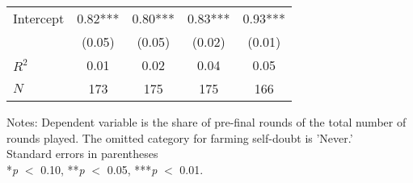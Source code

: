 \begin{table}[htbp]
\begin{threeparttable}
\begin{tabular}{l cccc}
Intercept           &        0.82***&        0.80***&        0.83***&        0.93***\\
                    &      (0.05)   &      (0.05)   &      (0.02)   &      (0.01)   \\
\hline
$R^2$               &        0.01   &        0.02   &        0.04   &        0.05   \\
$N$                 &         173   &         175   &         175   &         166   \\
\hline
\hline
\end{tabular}
\begin{tablenotes}
\footnotesize
\item{Notes: Dependent variable is the share of pre-final rounds of the total number of rounds played. The omitted category for farming self-doubt is 'Never.' \\ Standard errors in parentheses \\ *\textit{p} $<$ 0.10, **\textit{p} $<$ 0.05, ***\textit{p} $<$ 0.01.}
\end{tablenotes}
\end{threeparttable}
\end{table}
